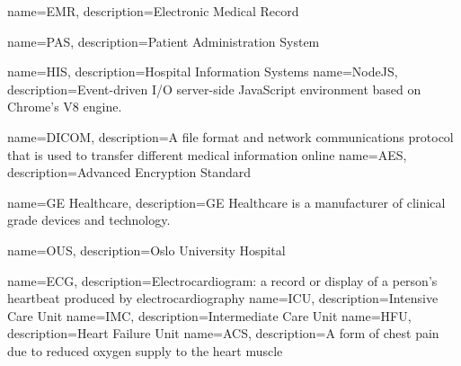 {
    name=EMR,
    description={Electronic Medical Record}
}

{
    name=PAS,
    description={Patient Administration System}
}

{
    name=HIS,
    description={Hospital Information Systems}
}
{
    name=NodeJS,
    description={Event-driven I/O server-side JavaScript environment based on Chrome's V8 engine.}
}

{
    name=DICOM,
    description={A file format and network communications protocol that is used to transfer different medical information online}
}
{
    name=AES,
    description={Advanced Encryption Standard}
}

{
    name=GE Healthcare,
    description={GE Healthcare is a manufacturer of clinical grade devices and technology.}
}

{
    name=OUS,
    description={Oslo University Hospital}
}

{
    name=ECG,
    description={Electrocardiogram: a record or display of a person's heartbeat produced by electrocardiography}
}
{
    name=ICU,
    description={Intensive Care Unit}
}
{
    name=IMC,
    description={Intermediate Care Unit}
}
{
    name=HFU,
    description={Heart Failure Unit}
}
{
    name=ACS,
    description={A form of chest pain due to reduced oxygen supply to the heart muscle}
}